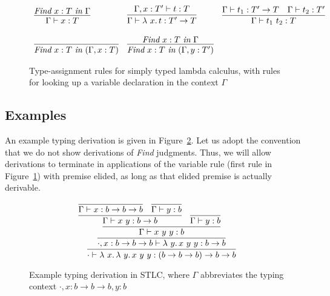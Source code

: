\begin{figure}
\[
\begin{array}{lll}
\infer{\Gamma\vdash x : T}{\textit{Find}\ x:T\ \textit{in}\ \Gamma} 

&

\infer{\Gamma\vdash \lam{x}{t} : T' \to T}
      {\Gamma,x:T'\vdash t:T}

&

\infer{\Gamma\vdash t_1\ t_2 : T}
      {\Gamma\vdash t_1 : T' \to T &
       \Gamma\vdash t_2 : T'}
      \\
      \\

\infer{\textit{Find}\ x:T\ \textit{in}\ (\Gamma, x:T)}{\ }

&

\infer{\textit{Find}\ x:T\ \textit{in}\ (\Gamma, y:T')}{\textit{Find}\ x:T\ \textit{in}\ \Gamma}

&

\ 
\end{array}
\]
\caption{Type-assignment rules for simply typed lambda calculus, with rules for looking up a variable declaration in the context $\Gamma$}
\label{fig:stlctpassign}
\end{figure}

\subsection{Examples}

An example typing derivation is given in Figure~\ref{fig:stlcex}.  Let us adopt the convention that
we do not show derivations of \textit{Find} judgments.  Thus, we will allow derivations to terminate
in applications of the variable rule (first rule in Figure~\ref{fig:stlctpassign}) with premise elided, as long
as that elided premise is actually derivable.

\begin{figure}
  \[
  \infer{\cdot \vdash \lam{x}{\lam{y}{x\ y\ y}} : (b \to b \to b) \to b \to b}
        {\infer{\cdot,x:b \to b \to b \vdash \lam{y}{x\ y\ y} : b \to b}
          {\infer{\Gamma \vdash x\ y\ y : b}
            {\infer{\Gamma \vdash x\ y : b \to b}
              {\infer{\Gamma \vdash x : b \to b \to b}{\ }
              & \infer{\Gamma \vdash y : b}{\ }}
            &\infer{\Gamma \vdash y : b}{\ }}}}
  \]
\caption{Example typing derivation in STLC, where $\Gamma$ abbreviates the typing context $\cdot,x:b \to b \to b, y : b$}
\label{fig:stlcex}
\end{figure}

